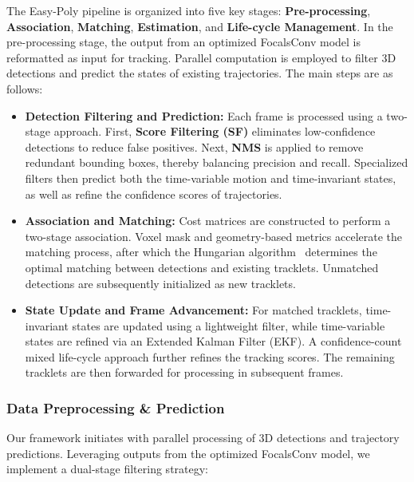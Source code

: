 The Easy-Poly pipeline is organized into five key stages: \textbf{Pre-processing}, \textbf{Association}, \textbf{Matching}, \textbf{Estimation}, and \textbf{Life-cycle Management}. In the pre-processing stage, the output from an optimized FocalsConv model is reformatted as input for tracking. Parallel computation is employed to filter 3D detections and predict the states of existing trajectories. The main steps are as follows:
\begin{itemize}
    \item \textbf{Detection Filtering and Prediction:} Each frame is processed using a two-stage approach. First, \textbf{Score Filtering (SF)} eliminates low-confidence detections to reduce false positives. Next, \textbf{NMS} is applied to remove redundant bounding boxes, thereby balancing precision and recall. Specialized filters then predict both the time-variable motion and time-invariant states, as well as refine the confidence scores of trajectories.
    \item \textbf{Association and Matching:} Cost matrices are constructed to perform a two-stage association. Voxel mask and geometry-based metrics accelerate the matching process, after which the Hungarian algorithm~\cite{kuhn1955hungarian} determines the optimal matching between detections and existing tracklets. Unmatched detections are subsequently initialized as new tracklets.
    \item \textbf{State Update and Frame Advancement:} For matched tracklets, time-invariant states are updated using a lightweight filter, while time-variable states are refined via an Extended Kalman Filter (EKF). A confidence-count mixed life-cycle approach further refines the tracking scores. The remaining tracklets are then forwarded for processing in subsequent frames.
\end{itemize}




\subsubsection{Data Preprocessing \& Prediction}

Our framework initiates with parallel processing of 3D detections and trajectory predictions. Leveraging outputs from the optimized FocalsConv model, we implement a dual-stage filtering strategy:

